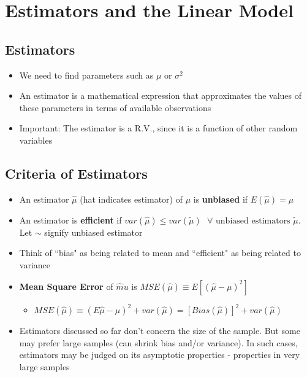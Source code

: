 \documentclass[10pt, oneside]{article}
\begin{document}
\section{Estimators and the Linear Model}

\subsection{Estimators}
\begin{itemize}
    \item We need to find parameters such as $\mu$ or $\sigma^2$
    \item An estimator is a mathematical expression that approximates the values of these parameters in terms of available observations
    \item Important: The estimator is a R.V., since it is a function of other random variables
\end{itemize}

\subsection{Criteria of Estimators}
\begin{itemize}
    \item An estimator $\hat \mu$ (hat indicates estimator) of $\mu$ is \textbf{unbiased} if $E(\hat \mu) = \mu$
    \item An estimator is \textbf{efficient} if $var(\hat \mu) \leq var(\tilde{\mu})\text{ } \forall \text{ unbiased estimators } \tilde \mu$. Let $\sim$ signify unbiased estimator
    \item Think of ``bias" as being related to mean and ``efficient" as being related to variance
    \item \textbf{Mean Square Error} of $\hat mu$ is $MSE(\hat \mu)\equiv E[(\hat \mu -\mu)^2]$
    \begin{itemize}
        \item $MSE(\hat \mu) \equiv (E\hat \mu -\mu)^2 + var(\hat \mu) = [Bias(\hat \mu)]^2 + var(\hat \mu)$
    \end{itemize}
    \item Estimators discussed so far don't concern the size of the sample. But some may prefer large samples (can shrink bias and/or variance). In such cases, estimators may be judged on its asymptotic properties - properties in very large samples
\end{itemize}
\end{document}
